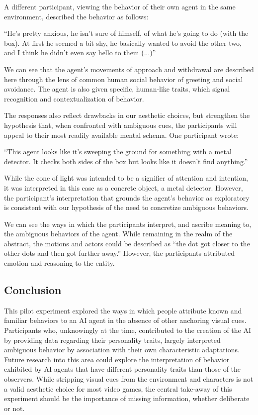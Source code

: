 A different participant, viewing the behavior of their own agent in the same environment, described the behavior as follows:

\begin{retQuestion}{}
    “He’s pretty anxious, he isn’t sure of himself, of what he’s going to do (with the box). At first he seemed a bit shy, he basically wanted to avoid the other two, and I think he didn’t even say hello to them (...)”
\end{retQuestion}


We can see that the agent’s movements of approach and withdrawal are described here through the lens of common human social behavior of greeting and social avoidance. The agent is also given specific, human-like traits, which signal recognition and contextualization of behavior.

The responses also reflect drawbacks in our aesthetic choices, but strengthen the hypothesis that, when confronted with ambiguous cues, the participants will appeal to their most readily available mental schema. One participant wrote:

\begin{retQuestion}{}
   “This agent looks like it’s sweeping the ground for something with a metal detector. It checks both sides of the box but looks like it doesn’t find anything.”
\end{retQuestion}

While the cone of light was intended to be a signifier of attention and intention, it was interpreted in this case as a concrete object, a metal detector. However, the participant’s interpretation that grounds the agent’s behavior as exploratory is consistent with our hypothesis of the need to concretize ambiguous behaviors.

We can see the ways in which the participants interpret, and ascribe meaning to, the ambiguous behaviors of the agent. While remaining in the realm of the abstract, the motions and actors could be described as “the dot got closer to the other dots and then got further away.” However, the participants attributed emotion and reasoning to the entity.

\subsection{Conclusion}

This pilot experiment explored the ways in which people attribute known and familiar behaviors to an AI agent in the absence of other anchoring visual cues. Participants who, unknowingly at the time, contributed to the creation of the AI by providing data regarding their personality traits, largely interpreted ambiguous behavior by association with their own characteristic adaptations. Future research into this area could explore the interpretation of behavior exhibited by AI agents that have different personality traits than those of the observers. While stripping visual cues from the environment and characters is not a valid aesthetic choice for most video games, the central take-away of this experiment should be the importance of missing information, whether deliberate or not.


